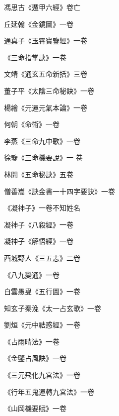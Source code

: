 \begin{pinyinscope}
 馮思古《遁甲六經》卷亡



 丘延翰《金鏡圖》一卷



 通真子《玉霄寶鑒經》一卷



 《三命指掌訣》一卷



 文靖《通玄五命新括》三卷



 董子平《太陰三命秘訣》一卷



 楊繪《元運元氣本論》一卷



 何朝《命術》一卷



 李蒸《三命九中歌》一卷



 徐鑒《三命機要說》一
 卷



 林開《五命秘訣》五卷



 僧善嵩《訣金書一十四字要訣》一卷



 《凝神子》一卷不知姓名



 凝神子《八殺經》一卷



 凝神子《解悟經》一卷



 西城野人《三五志》二卷



 《八九變通》一卷



 白雲愚叟《五行圖》一卷



 知玄子秦浼《太一占玄歌》一卷



 劉烜《元中祛惑經》一卷



 《占雨晴法》一卷



 《金鑒占風訣》一卷



 《三元飛化九宮法》一卷



 《行年五鬼運轉九宮法》一卷



 《山岡機要賦》一卷




\end{pinyinscope}
